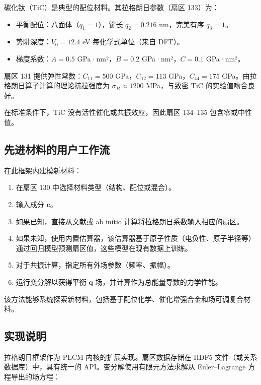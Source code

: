 \documentclass[12pt,a4paper]{article}
\begin{document}
	碳化钛（TiC）是典型的配位材料。其拉格朗日参数（扇区 133）为：
	
	\begin{itemize}
		\item 平衡配位：八面体（\(q_1=1\)），键长 \(q_2 = 0.216\) nm，完美有序 \(q_3=1\)。
		\item 势阱深度：\(V_0 = 12.4\) eV 每化学式单位（来自 DFT）。
		\item 梯度系数：\(A=0.5\) GPa·nm²，\(B=0.2\) GPa·nm²，\(C=0.1\) GPa·nm²。
	\end{itemize}
	
	扇区 131 提供弹性常数：\(C_{11}=500\) GPa，\(C_{12}=113\) GPa，\(C_{44}=175\) GPa。由拉格朗日算子计算的理论抗拉强度为 \(\sigma_B \approx 1200\) MPa，与致密 TiC 的实验值吻合良好。
	
	在标准条件下，TiC 没有活性催化或共振效应，因此扇区 134–135 包含零或中性值。
	
	\subsection{先进材料的用户工作流}
	\label{subsec:workflow}
	
	在此框架内建模新材料：
	
	\begin{enumerate}
		\item 在扇区 130 中选择材料类型（结构、配位或混合）。
		\item 输入成分 \(\mathbf{c}\)。
		\item 如果已知，直接从文献或 ab initio 计算将拉格朗日系数输入相应的扇区。
		\item 如果未知，使用内置估算器，该估算器基于原子性质（电负性、原子半径等）通过回归模型预测扇区值，这些模型在现有数据上训练。
		\item 对于共振计算，指定所有外场参数（频率、振幅）。
		\item 运行变分解以获得平衡 \(\mathbf{q}\) 场，并计算作为总能量导数的力学性能。
	\end{enumerate}
	
	该方法能够系统探索新材料，包括基于配位化学、催化增强合金和场可调复合材料。
	
	\subsection{实现说明}
	\label{subsec:implementation}
	
	拉格朗日框架作为 PLCM 内核的扩展实现。扇区数据存储在 HDF5 文件（或关系数据库）中，具有统一的 API。变分解使用有限元方法求解从 Euler–Lagrange 方程导出的场方程：
	
\end{document}
